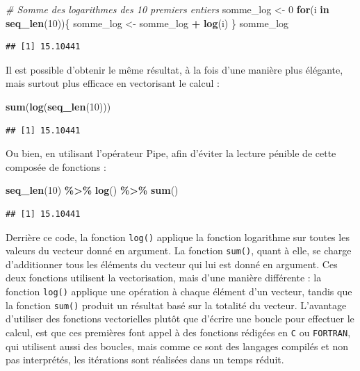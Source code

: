 \documentclass[
  11pt,
]{book}
\newenvironment{Shaded}{\begin{snugshade}}{\end{snugshade}}
\newcommand{\CommentTok}[1]{\textcolor[rgb]{0.56,0.35,0.01}{\textit{#1}}}
\newcommand{\ControlFlowTok}[1]{\textcolor[rgb]{0.13,0.29,0.53}{\textbf{#1}}}
\newcommand{\DecValTok}[1]{\textcolor[rgb]{0.00,0.00,0.81}{#1}}
\newcommand{\KeywordTok}[1]{\textcolor[rgb]{0.13,0.29,0.53}{\textbf{#1}}}
\newcommand{\NormalTok}[1]{#1}
\newcommand{\OperatorTok}[1]{\textcolor[rgb]{0.81,0.36,0.00}{\textbf{#1}}}
\newcommand{\StringTok}[1]{\textcolor[rgb]{0.31,0.60,0.02}{#1}}
\numberwithin{equation}{section}
\numberwithin{countremarque}{section}
\begin{document}
\begin{Shaded}
\begin{Highlighting}[]
\CommentTok{\# Somme des logarithmes des 10 premiers entiers}
\NormalTok{somme\_log \textless{}{-}}\StringTok{ }\DecValTok{0}
\ControlFlowTok{for}\NormalTok{(i }\ControlFlowTok{in} \KeywordTok{seq\_len}\NormalTok{(}\DecValTok{10}\NormalTok{))\{}
\NormalTok{  somme\_log \textless{}{-}}\StringTok{ }\NormalTok{somme\_log }\OperatorTok{+}\StringTok{ }\KeywordTok{log}\NormalTok{(i)}
\NormalTok{\}}
\NormalTok{somme\_log}
\end{Highlighting}
\end{Shaded}

\begin{lstlisting}
## [1] 15.10441
\end{lstlisting}

Il est possible d'obtenir le même résultat, à la fois d'une manière plus élégante, mais surtout plus efficace en vectorisant le calcul :

\begin{Shaded}
\begin{Highlighting}[]
\KeywordTok{sum}\NormalTok{(}\KeywordTok{log}\NormalTok{(}\KeywordTok{seq\_len}\NormalTok{(}\DecValTok{10}\NormalTok{)))}
\end{Highlighting}
\end{Shaded}

\begin{lstlisting}
## [1] 15.10441
\end{lstlisting}

Ou bien, en utilisant l'opérateur Pipe, afin d'éviter la lecture pénible de cette composée de fonctions :

\begin{Shaded}
\begin{Highlighting}[]
\KeywordTok{seq\_len}\NormalTok{(}\DecValTok{10}\NormalTok{) }\OperatorTok{\%\textgreater{}\%}\StringTok{ }\KeywordTok{log}\NormalTok{() }\OperatorTok{\%\textgreater{}\%}\StringTok{ }\KeywordTok{sum}\NormalTok{()}
\end{Highlighting}
\end{Shaded}

\begin{lstlisting}
## [1] 15.10441
\end{lstlisting}

Derrière ce code, la fonction \texttt{log()} applique la fonction logarithme sur toutes les valeurs du vecteur donné en argument. La fonction \texttt{sum()}, quant à elle, se charge d'additionner tous les éléments du vecteur qui lui est donné en argument. Ces deux fonctions utilisent la vectorisation, mais d'une manière différente : la fonction \texttt{log()} applique une opération à chaque élément d'un vecteur, tandis que la fonction \texttt{sum()} produit un résultat basé sur la totalité du vecteur. L'avantage d'utiliser des fonctions vectorielles plutôt que d'écrire une boucle pour effectuer le calcul, est que ces premières font appel à des fonctions rédigées en \texttt{C} ou \texttt{FORTRAN}, qui utilisent aussi des boucles, mais comme ce sont des langages compilés et non pas interprétés, les itérations sont réalisées dans un temps réduit.
\end{document}
